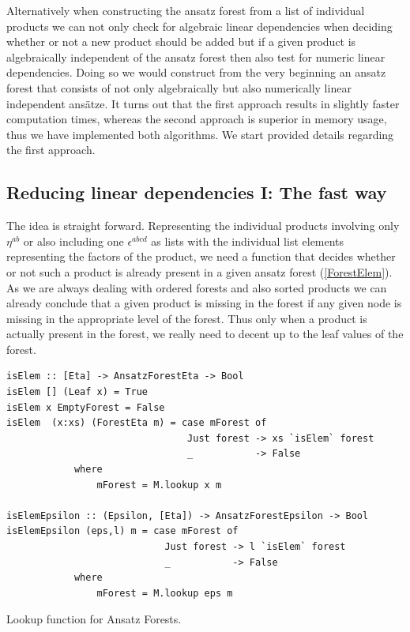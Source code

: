 \documentclass[a4paper,12pt, DIV=14, BCOR=5mm, twoside, headsepline, numbers=noenddot]{scrbook}
\begin{document}
Alternatively when constructing the ansatz forest from a list of individual products we can not only check for algebraic linear dependencies when deciding whether or not a new product should be added but if a given product is algebraically independent of the ansatz forest then also test for numeric linear dependencies. Doing so we would construct from the very beginning an ansatz forest that consists of not only algebraically but also numerically linear independent ansätze.
It turns out that the first approach results in slightly faster computation times, whereas the second approach is superior in memory usage, thus we have implemented both algorithms. 
We start provided details regarding the first approach. 

\subsection*{Reducing linear dependencies I:  The fast way}

The idea is straight forward. Representing the individual products involving only $\eta^{ab}$ or also including one $\epsilon^{abcd}$ as lists with the individual list elements representing the factors of the product, we need a function that decides whether or not such a product is already present in a given ansatz forest (\ref{ForestElem}). As we are always dealing with ordered forests and also sorted products we can already conclude that a given product is missing in the forest if any given node is missing in the appropriate level of the forest. Thus only when a product is actually present in the forest, we really need to decent up to the leaf values of the forest.
\begin{listing}[hbt!]
\begin{verbatim}
isElem :: [Eta] -> AnsatzForestEta -> Bool
isElem [] (Leaf x) = True
isElem x EmptyForest = False
isElem  (x:xs) (ForestEta m) = case mForest of
                                Just forest -> xs `isElem` forest
                                _           -> False
            where
                mForest = M.lookup x m

isElemEpsilon :: (Epsilon, [Eta]) -> AnsatzForestEpsilon -> Bool
isElemEpsilon (eps,l) m = case mForest of
                            Just forest -> l `isElem` forest
                            _           -> False
            where
                mForest = M.lookup eps m  
\end{verbatim} 
\caption{Lookup function for Ansatz Forests.}\label{ForestElem}
\end{listing}
\end{document}
